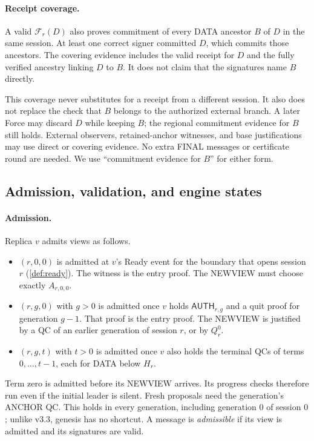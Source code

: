 \documentclass[11pt,a4paper]{article}
\newif\ifrevmarks
\newcommand{\Rv}[1]{\ifrevmarks\leavevmode{\color{rvBlue}#1}\else#1\fi}
\newcommand{\FC}{\mathcal F}
\newcommand{\tagg}[1]{\ensuremath{\mathsf{#1}}}
\begin{document}
\paragraph{Receipt coverage.}
\label{sec:coverage}
A valid $\FC_r(D)$ also proves commitment of every DATA ancestor $B$
of $D$ in the same \Rv{session}. At least one correct signer committed
$D$, which commits those ancestors. The covering evidence includes the
valid receipt for $D$ and the fully verified ancestry linking $D$ to $B$.
It does not claim that the signatures name $B$ directly.

This coverage never substitutes for a receipt from a different session.
It also does not replace the check that $B$ belongs to the authorized
external branch. A later Force may discard $D$ while keeping $B$; the
regional commitment evidence for $B$ still holds. External observers,
retained-anchor witnesses, and base justifications may use direct or
covering evidence. No extra FINAL messages or certificate round are
needed. We use ``commitment evidence for $B$'' for either form.

\subsection{Admission, validation, and engine states}
\label{sec:admission}
\paragraph{Admission.}
Replica $v$ admits views as follows.
\begin{itemize}
\item $(r,0,0)$ is admitted at $v$'s Ready event for the boundary that
opens session $r$ (\cref{def:ready}). The witness is the entry proof.
The NEWVIEW must choose exactly $A_{r,0,0}$.
\item $(r,g,0)$ with $g>0$ is admitted once $v$ holds
$\tagg{AUTH}_{r,g}$ and a quit proof for generation $g-1$. That proof is
the entry proof. The NEWVIEW is justified by a QC of an earlier
generation of session $r$, or by $Q_r^0$.
\item $(r,g,t)$ with $t>0$ is admitted once $v$ also holds the terminal
QCs of terms $0,\ldots,t-1$, each for DATA below $H_r$.
\end{itemize}
Term zero is admitted before its NEWVIEW arrives. Its progress checks
therefore run even if the initial leader is silent. Fresh proposals need
the generation's ANCHOR QC. This holds in every generation, including
generation $0$ of session $0$; unlike v3.3, genesis has no shortcut. A
message is \emph{admissible} if its view is admitted and its signatures
are valid.
\end{document}
